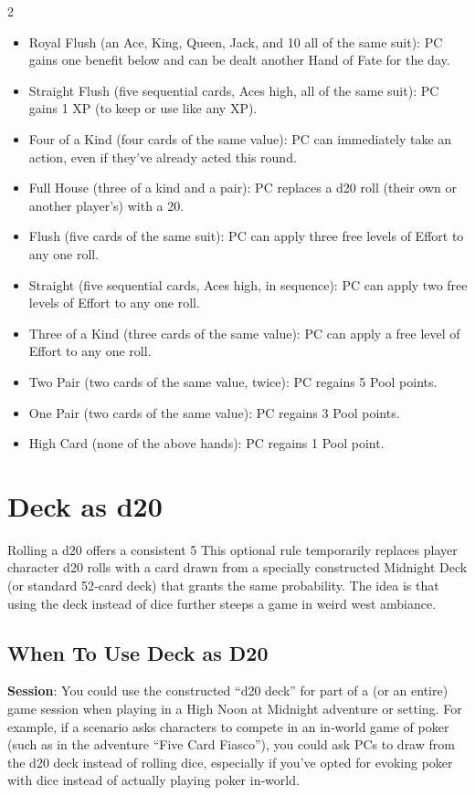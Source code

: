 \begin{multicols}{2}
\begin{itemize}
\item Royal Flush (an Ace, King, Queen, Jack, and 10 all of the same suit): PC gains one benefit below and can be dealt another Hand of Fate for the day. 
\item Straight Flush (five sequential cards, Aces high, all of the same suit): PC gains 1 XP (to keep or use like any XP). 
\item Four of a Kind (four cards of the same value): PC can immediately take an action, even if they’ve already acted this round. 
\item Full House (three of a kind and a pair): PC replaces a d20 roll (their own or another player’s) with a 20. 
\item Flush (five cards of the same suit): PC can apply three free levels of Effort to any one roll. 
\item Straight (five sequential cards, Aces high, in sequence): PC can apply two free levels of Effort to any one roll. 
\item Three of a Kind (three cards of the same value): PC can apply a free level of Effort to any one roll. 
\item Two Pair (two cards of the same value, twice): PC regains 5 Pool points. 
\item One Pair (two cards of the same value): PC regains 3 Pool points. 
\item High Card (none of the above hands): PC regains 1 Pool point.
\end{itemize}

\chapter{Deck as d20}

Rolling a d20 offers a consistent 5%
This optional rule temporarily replaces player character d20 rolls with a card drawn from a specially constructed Midnight Deck (or standard 52‑card deck) that grants the same probability. The idea is that using the deck instead of dice further steeps a game in weird west ambiance.

\section{When To Use Deck as D20}

\textbf{Session}: You could use the constructed “d20 deck” for part of a (or an entire) game session when playing in a High Noon at Midnight adventure or setting. For example, if a scenario asks characters to compete in an in‑world game of poker (such as in the adventure “Five Card Fiasco”), you could ask PCs to draw from the d20 deck instead of rolling dice, especially if you’ve opted for evoking poker with dice instead of actually playing poker in‑world. 


\end{multicols}
